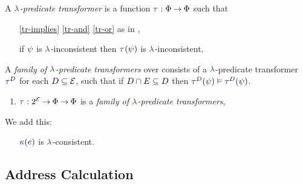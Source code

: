 
\begin{definition}
  \label{def:trans'}
  A \emph{$\labeling$-predicate transformer} is a %
  function
  $\aTr{}{}:\Formulae\fun\Formulae$ such that
  \begin{enumerate}[,label=(\textsc{x}\arabic*),ref=\textsc{x}\arabic*]
  \item[\eqref{tr-implies}]
    \eqref{tr-and}\;
    \eqref{tr-or}\; as in ,
  \item[{\labeltext[\textsc{x}4]{(\textsc{x}4)}{tr-false}}] 
    if $\psi$ is $\labeling$-inconsistent then $\aTr{}{\bForm}$ is $\labeling$-inconsistent.
  \end{enumerate}

  \label{def:family'}
  A \emph{family of $\labeling$-predicate transformers} over consists of a
  $\labeling$-predicate transformer $\aTr{\bEvs}{}$ for each
  $D\subseteq\mathcal{E}$, such that if $D \cap E \subseteq D$
  then $\aTr{\cEvs}{\bForm} \rimplies \aTr{\bEvs}{\bForm}$.

  
  \begin{enumerate}[,label=(\textsc{m}\arabic*),ref=\textsc{m}\arabic*]
  \setcounter{enumi}{\value{Btau}}
  \item \label{pom-tau'}
    $\aTr{}{}:2^{\AllEvents}\fun\Formulae \fun\Formulae$ is a \emph{family of $\labeling$-predicate transformers}, 
  \end{enumerate}
\end{definition}

We add this:
\begin{enumerate}
\item[{\labeltext[\textsc{m}3a]{(\textsc{m}3a)}{pom-kappa-sat}}]
  ${\color{blue}\kappa}(e)$ is $\labeling$-consistent.
\end{enumerate}



\subsection{Address Calculation}
\label{sec:addr}

